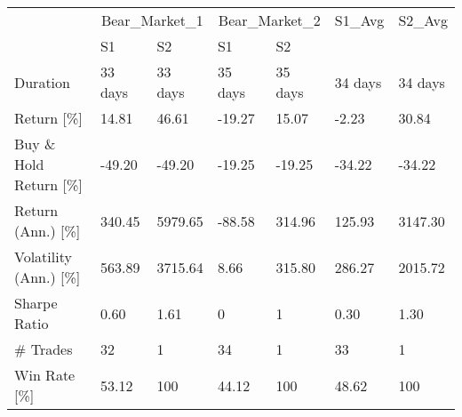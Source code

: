 \begin{tabular}{lllllll}
\toprule
 & \multicolumn{2}{r}{Bear_Market_1} & \multicolumn{2}{r}{Bear_Market_2} & S1_Avg & S2_Avg \\
 & S1 & S2 & S1 & S2 &  &  \\
\midrule
Duration & 33 days   & 33 days   & 35 days   & 35 days   & 34 days   & 34 days   \\
Return  [\%] & 14.81 & 46.61 & -19.27 & 15.07 & -2.23 & 30.84 \\
Buy \& Hold Return  [\%] & -49.20 & -49.20 & -19.25 & -19.25 & -34.22 & -34.22 \\
Return (Ann.)  [\%] & 340.45 & 5979.65 & -88.58 & 314.96 & 125.93 & 3147.30 \\
Volatility (Ann.)  [\%] & 563.89 & 3715.64 & 8.66 & 315.80 & 286.27 & 2015.72 \\
Sharpe Ratio & 0.60 & 1.61 & 0  & 1  & 0.30 & 1.30 \\
\# Trades & 32 & 1 & 34 & 1 & 33  & 1  \\
Win Rate  [\%] & 53.12 & 100  & 44.12 & 100  & 48.62 & 100  \\
\bottomrule
\end{tabular}
